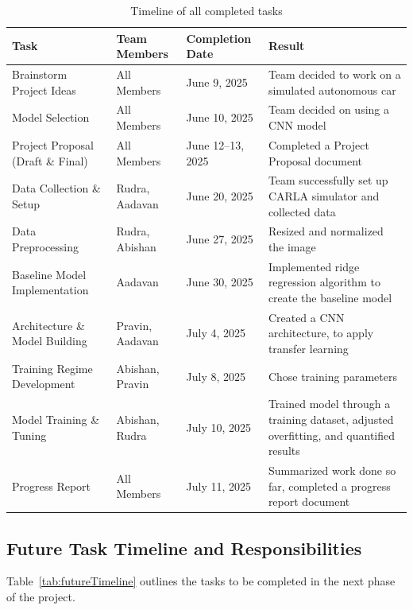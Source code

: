 \documentclass{article} %
\begin{document}
\begin{table}[h!]
\centering
\caption{Timeline of all completed tasks}
\begin{tabular}{|p{2.5cm}|p{3cm}|p{3cm}|p{5.5cm}|}
\hline
\textbf{Task} & \textbf{Team Members} & \textbf{Completion Date} & \textbf{Result} \\
\hline
Brainstorm Project Ideas & All Members & June 9, 2025 & Team decided to work on a simulated autonomous car \\
\hline
Model Selection & All Members & June 10, 2025 & Team decided on using a CNN model \\
\hline
Project Proposal (Draft \& Final) & All Members & June 12--13, 2025 & Completed a Project Proposal document \\
\hline
Data Collection \& Setup & Rudra, Aadavan & June 20, 2025 & Team successfully set up CARLA simulator and collected data \\
\hline
Data Preprocessing & Rudra, Abishan & June 27, 2025 & Resized and normalized the image \\
\hline
Baseline Model Implementation & Aadavan & June 30, 2025 & Implemented ridge regression algorithm to create the baseline model \\
\hline
Architecture \& Model Building & Pravin, Aadavan & July 4, 2025 & Created a CNN architecture, to apply transfer learning \\
\hline
Training Regime Development & Abishan, Pravin & July 8, 2025 & Chose training parameters \\
\hline
Model Training \& Tuning & Abishan, Rudra & July 10, 2025 & Trained model through a training dataset, adjusted overfitting, and quantified results \\
\hline
Progress Report & All Members & July 11, 2025 & Summarized work done so far, completed a progress report document \\
\hline
\end{tabular}
\label{tab:currentTimeline}
\end{table}

\subsection{Future Task Timeline and Responsibilities}

Table~\ref{tab:futureTimeline} outlines the tasks to be completed in the next phase of the project.
\end{document}
